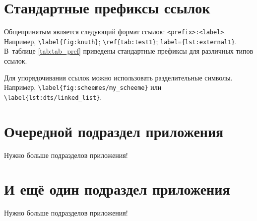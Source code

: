 \section{Стандартные префиксы ссылок}\label{app:B4}

Общепринятым является следующий формат ссылок: \texttt{<prefix>:<label>}.
Например, \verb+\label{fig:knuth}+; \verb+\ref{tab:test1}+; \verb+label={lst:external1}+.
В~таблице \cref{tab:tab_pref} приведены стандартные префиксы для различных
типов ссылок.

\begin{table}[htbp]
    \captionsetup{justification=centering}
\end{table}


Для упорядочивания ссылок можно использовать разделительные символы.
Например, \verb+\label{fig:scheemes/my_scheeme}+ или \\ \verb+\label{lst:dts/linked_list}+.

\section{Очередной подраздел приложения}\label{app:B5}

Нужно больше подразделов приложения!

\section{И ещё один подраздел приложения}\label{app:B6}

Нужно больше подразделов приложения!

\clearpage
{}

%
